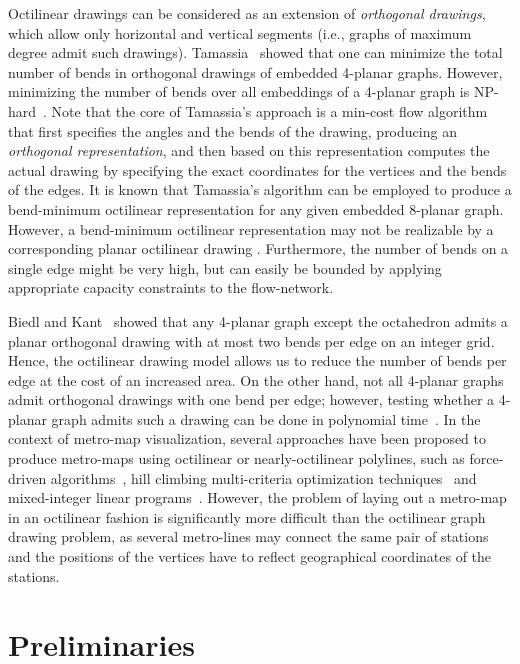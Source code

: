\documentclass[a4paper,twoside,11pt]{article}
\begin{document}
Octilinear drawings can be considered as an extension of
\emph{orthogonal drawings}, which allow only horizontal and vertical
segments (i.e., graphs of maximum degree  admit such drawings).
Tamassia~\cite{Tamassia87} showed that one can minimize the total
number of bends in orthogonal drawings of embedded 4-planar graphs.
However, minimizing the number of bends over all embeddings of a
4-planar graph is NP-hard~\cite{GT01}. Note that the core of
Tamassia's approach is a min-cost flow algorithm that first
specifies the angles and the bends of the drawing, producing an
\emph{orthogonal representation}, and then based on this
representation computes the actual drawing by specifying the exact
coordinates for the vertices and the bends of the edges. It is known
that Tamassia's algorithm can be employed to produce a bend-minimum
octilinear representation for any given embedded 8-planar graph.
However, a bend-minimum octilinear representation may not be
realizable by a corresponding planar octilinear drawing \cite{BT04}.
Furthermore, the number of bends on a single edge might be very
high, but can easily be bounded by applying appropriate capacity
constraints to the flow-network.

Biedl and Kant~\cite{BK94} showed that any 4-planar graph except the
octahedron admits a planar orthogonal drawing with at most two bends
per edge on an  integer grid. Hence, the octilinear drawing
model allows us to reduce the number of bends per edge at the cost
of an increased area. On the other hand, not all 4-planar graphs
admit orthogonal drawings with one bend per edge; however, testing
whether a 4-planar graph admits such a drawing can be done in
polynomial time~\cite{BKRW14}. In the context of metro-map
visualization, several approaches have been proposed to produce
metro-maps using octilinear or nearly-octilinear polylines, such as
force-driven algorithms~\cite{HMN06}, hill climbing multi-criteria
optimization techniques~\cite{SROW11} and mixed-integer linear
programs~\cite{NW11}. However, the problem of laying out a metro-map
in an octilinear fashion is significantly more difficult than the
octilinear graph drawing problem, as several metro-lines may connect
the same pair of stations and the positions of the vertices have to
reflect geographical coordinates of the stations.


\section{Preliminaries}
\label{sec:preliminaries}
\end{document}
